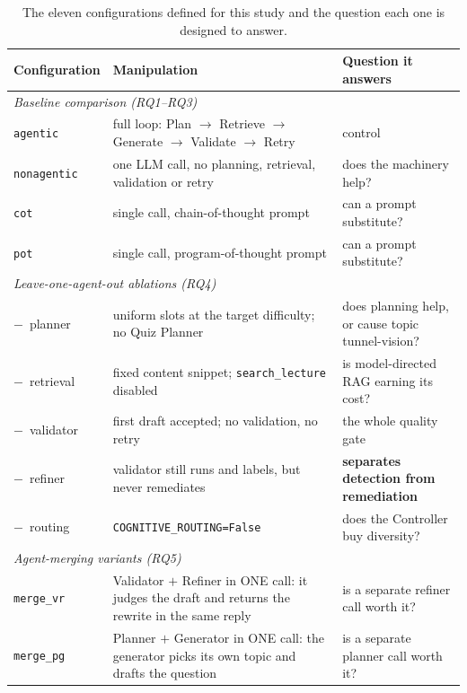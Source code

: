 \begin{table}[H]
\centering
\caption{The eleven configurations defined for this study and the question
each one is designed to answer.}
\label{tab:configs}
\footnotesize
\setlength{\tabcolsep}{4pt}
\begin{tabular}{|l|p{6.4cm}|p{4.0cm}|}
\hline
\textbf{Configuration} & \textbf{Manipulation} & \textbf{Question it answers} \\
\hline
\multicolumn{3}{|l|}{\emph{Baseline comparison (RQ1--RQ3)}} \\
\hline
\texttt{agentic}     & full loop: Plan $\rightarrow$ Retrieve $\rightarrow$
                       Generate $\rightarrow$ Validate $\rightarrow$ Retry
                     & control                        \\
\texttt{nonagentic}  & one LLM call, no planning, retrieval, validation or retry
                     & does the machinery help?       \\
\texttt{cot}         & single call, chain-of-thought prompt
                     & can a prompt substitute?       \\
\texttt{pot}         & single call, program-of-thought prompt
                     & can a prompt substitute?       \\
\hline
\multicolumn{3}{|l|}{\emph{Leave-one-agent-out ablations (RQ4)}} \\
\hline
$-$\, planner    & uniform slots at the target difficulty; no Quiz Planner
                & does planning help, or cause topic tunnel-vision? \\
$-$\, retrieval  & fixed content snippet; \texttt{search\_lecture} disabled
                & is model-directed RAG earning its cost? \\
$-$\, validator  & first draft accepted; no validation, no retry
                & the whole quality gate \\
$-$\, refiner    & validator still runs and labels, but never remediates
                & \textbf{separates detection from remediation} \\
$-$\, routing    & \texttt{COGNITIVE\_ROUTING=False}
                & does the Controller buy diversity? \\
\hline
\multicolumn{3}{|l|}{\emph{Agent-merging variants (RQ5)}} \\
\hline
\texttt{merge\_vr} & Validator $+$ Refiner in ONE call: it judges the draft and
                     returns the rewrite in the same reply
                   & is a separate refiner call worth it? \\
\texttt{merge\_pg} & Planner $+$ Generator in ONE call: the generator picks its
                     own topic and drafts the question
                   & is a separate planner call worth it? \\
\hline
\end{tabular}
\end{table}


